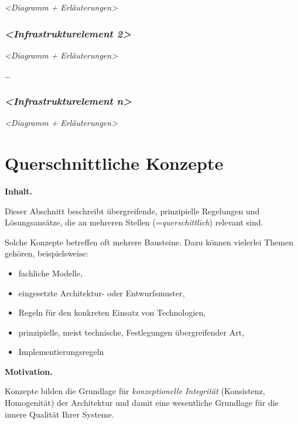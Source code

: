\documentclass[]{article}
\begin{document}
\emph{\textless{}Diagramm + Erläuterungen\textgreater{}}

\subsubsection{\texorpdfstring{\emph{\textless{}Infrastrukturelement
2\textgreater{}}}{\textless{}Infrastrukturelement 2\textgreater{}}}\label{__emphasis_infrastrukturelement_2_emphasis}

\emph{\textless{}Diagramm + Erläuterungen\textgreater{}}

\ldots{}

\subsubsection{\texorpdfstring{\emph{\textless{}Infrastrukturelement
n\textgreater{}}}{\textless{}Infrastrukturelement n\textgreater{}}}\label{__emphasis_infrastrukturelement_n_emphasis}

\emph{\textless{}Diagramm + Erläuterungen\textgreater{}}

\section{Querschnittliche Konzepte}\label{section-concepts}

\textbf{Inhalt.}

Dieser Abschnitt beschreibt übergreifende, prinzipielle Regelungen und
Lösungsansätze, die an mehreren Stellen (=\emph{querschittlich})
relevant sind.

Solche Konzepte betreffen oft mehrere Bausteine. Dazu können vielerlei
Themen gehören, beispielsweise:

\begin{itemize}
\item
  fachliche Modelle,
\item
  eingesetzte Architektur- oder Entwurfsmuster,
\item
  Regeln für den konkreten Einsatz von Technologien,
\item
  prinzipielle, meist technische, Festlegungen übergreifender Art,
\item
  Implementierungsregeln
\end{itemize}

\textbf{Motivation.}

Konzepte bilden die Grundlage für \emph{konzeptionelle Integrität}
(Konsistenz, Homogenität) der Architektur und damit eine wesentliche
Grundlage für die innere Qualität Ihrer Systeme.
\end{document}
